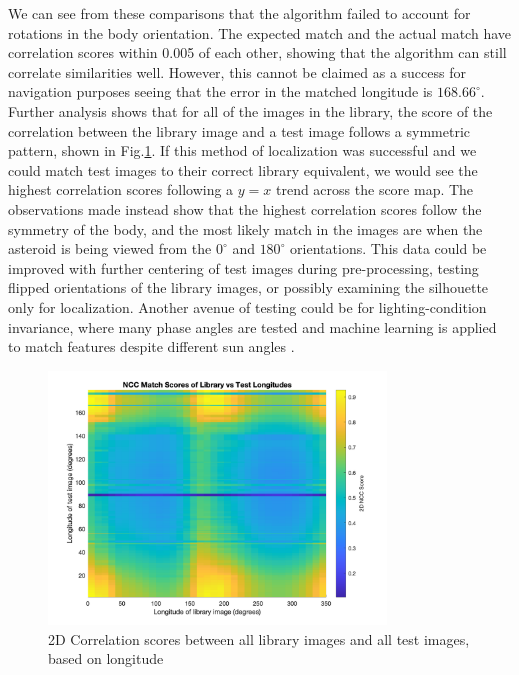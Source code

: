 We can see from these comparisons that the algorithm failed to account for rotations in the body orientation. The expected match and the actual match have correlation scores within 0.005 of each other, showing that the algorithm can still correlate similarities well. However, this cannot be claimed as a success for navigation purposes seeing that the error in the matched longitude is $168.66^{\circ}$. Further analysis shows that for all of the images in the library, the score of the correlation between the library image and a test image follows a symmetric pattern, shown in Fig.\ref{fig:heatmap}. If this method of localization was successful and we could match test images to their correct library equivalent, we would see the highest correlation scores following a $y=x$ trend across the score map. The observations made instead show that the highest correlation scores follow the symmetry of the body, and the most likely match in the images are when the asteroid is being viewed from the $0^{\circ}$ and $180^{\circ}$ orientations. This data could be improved with further centering of test images during pre-processing, testing flipped orientations of the library images, or possibly examining the silhouette only for localization. Another avenue of testing could be for lighting-condition invariance, where many phase angles are tested and machine learning is applied to match features despite different sun angles \citep{Manni2020}. 

\begin{figure}[H]
    \centering
    \includegraphics[width= 0.8\textwidth]{fig/all_scores.png}
    \caption{2D Correlation scores between all library images and all test images, based on longitude}
    \label{fig:heatmap}
\end{figure}


